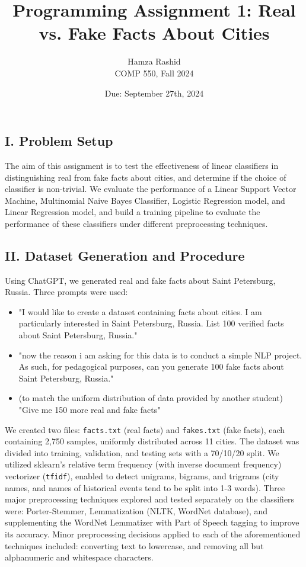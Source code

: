 \documentclass[11pt]{article}
\title{Programming Assignment 1: Real vs. Fake Facts About Cities}
\author{Hamza Rashid \\
COMP 550, Fall 2024}
\date{Due: September 27th, 2024}
\begin{document}
\maketitle

\subsection*{I. Problem Setup}
The aim of this assignment is to test the effectiveness of linear classifiers
in distinguishing real from fake facts about cities, and determine if the choice
of classifier is non-trivial. We evaluate the performance 
of a Linear Support Vector Machine, Multinomial Naive Bayes Classifier, 
Logistic Regression model, and Linear Regression model, and build a training pipeline
to evaluate the performance of these classifiers under different preprocessing 
techniques.


\subsection*{II. Dataset Generation and Procedure}
Using ChatGPT, we generated real and fake facts about Saint Petersburg, Russia. Three prompts were used:
\begin{itemize}
    \item "I would like to create a dataset containing facts about cities. 
    I am particularly interested in Saint Petersburg, Russia.
    List 100 verified facts about Saint Petersburg, Russia."
    \item "now the reason i am asking for this data is to conduct a simple NLP project. 
    As such, for pedagogical purposes, can you generate 100 fake facts about Saint Petersburg, Russia."
    \item (to match the uniform distribution of data provided by another student) "Give me 150 more real and fake facts"
\end{itemize}
We created two files: \texttt{facts.txt} (real facts) 
and \texttt{fakes.txt} (fake facts), each containing 2,750 samples, 
uniformly distributed across 11 cities. The dataset was divided into 
training, validation, and testing sets
with a 70/10/20 split. We utilized sklearn's relative term frequency (with inverse document frequency)
vectorizer (\texttt{tfidf}), 
enabled to detect unigrams, bigrams, and trigrams (city names, and names of historical 
events tend to be split into 1-3 words). Three major preprocessing techniques explored
and tested separately on the classifiers were: 
Porter-Stemmer, 
Lemmatization (NLTK, WordNet database), 
and supplementing the WordNet Lemmatizer 
with Part of Speech tagging 
to improve its accuracy.
Minor preprocessing decisions applied 
to each of the aforementioned techniques
included: converting text to lowercase, and
removing all but alphanumeric and whitespace characters.
\end{document}
